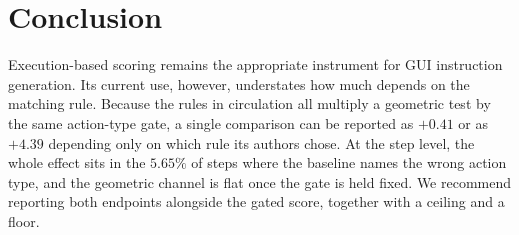 \documentclass[runningheads,a4paper]{llncs}
\begin{document}
\section{Conclusion}

Execution-based scoring remains the appropriate instrument for GUI instruction generation. Its
current use, however, understates how much depends on the matching rule. Because the rules in circulation all
multiply a geometric test by the same action-type gate, a single comparison can be reported as
$+0.41$ or as $+4.39$ depending only on which rule its authors chose. At the step level, the
whole effect sits in the $5.65\%$ of steps where the baseline names the wrong action type, and the
geometric channel is flat once the gate is held fixed. We recommend reporting both endpoints
alongside the gated score, together with a ceiling and a floor.
\end{document}
